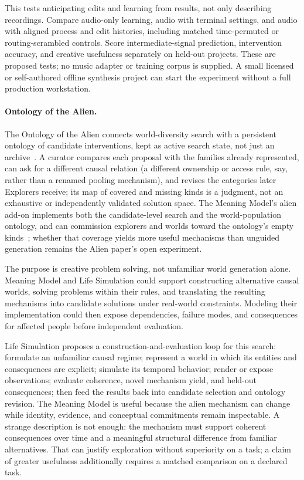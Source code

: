 \documentclass[10pt]{article}
\begin{document}
This tests anticipating edits and learning from results, not only describing
recordings. Compare audio-only learning, audio with terminal settings, and audio
with aligned process and edit histories, including matched time-permuted or
routing-scrambled controls. Score intermediate-signal prediction, intervention
accuracy, and creative usefulness separately on held-out projects. These are
proposed tests; no music adapter or training corpus is supplied. A small
licensed or self-authored offline synthesis project can start the experiment
without a full production workstation.

\paragraph{Ontology of the Alien.}
The Ontology of the Alien connects world-diversity search with a persistent ontology of
candidate interventions, kept as active search state, not just an
archive~\cite{westerbergOntology2026}. A curator compares
each proposal with the families already represented, can ask for a different causal
relation (a different ownership or access rule, say, rather than a renamed pooling
mechanism), and revises the categories later Explorers receive; its map of covered
and missing kinds is a judgment, not an exhaustive or independently validated
solution space.
The Meaning Model's alien add-on implements both the candidate-level search and
the world-population ontology, and can commission explorers and worlds toward
the ontology's empty kinds~\cite{westerbergMeaning2026}; whether that coverage
yields more useful mechanisms than unguided generation remains the Alien
paper's open experiment.

The purpose is creative problem solving, not unfamiliar world generation
alone. Meaning Model and Life Simulation could support constructing
alternative causal worlds, solving problems within their rules, and
translating the resulting mechanisms into candidate solutions under real-world
constraints. Modeling their implementation could then expose
dependencies, failure modes, and consequences for affected people before
independent evaluation.

Life Simulation proposes a construction-and-evaluation loop for this search:
formulate an unfamiliar causal regime;
represent a world in which its entities and consequences are explicit; simulate
its temporal behavior; render or expose observations; evaluate coherence,
novel mechanism yield, and held-out consequences; then feed the results back
into candidate selection and ontology revision.
The Meaning Model is useful because the alien mechanism can change while
identity, evidence, and conceptual commitments remain inspectable. A strange
description is not enough: the mechanism must support coherent consequences
over time and a meaningful structural difference from familiar alternatives.
That can justify exploration without superiority on a task; a claim of greater
usefulness additionally requires a matched comparison on a declared task.
\end{document}
